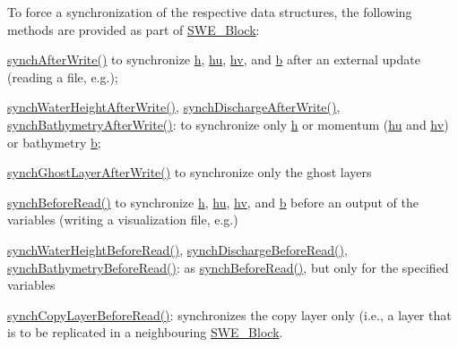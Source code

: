 To force a synchronization of the respective data structures, the following methods are provided as part of \hyperlink{classSWE__Block}{S\-W\-E\-\_\-\-Block}\-:
\begin{DoxyItemize}
\item \hyperlink{classSWE__Block_ae914f9bf6d4ef8f974f9f005114985e7}{synch\-After\-Write()} to synchronize \hyperlink{classSWE__Block_a64a0f8f437f38b5f3b8ec5b4abdb864e}{h}, \hyperlink{classSWE__Block_aec2c1278fdb23f083216d8d397f26060}{hu}, \hyperlink{classSWE__Block_a0897aa3c2d78749f209c95e08196d831}{hv}, and \hyperlink{classSWE__Block_af7487209129f40b26ea171762754a261}{b} after an external update (reading a file, e.\-g.);
\item \hyperlink{classSWE__Block_aa2924833e29a795d8c04fb79bfe794de}{synch\-Water\-Height\-After\-Write()}, \hyperlink{classSWE__Block_a94c34030153178c9d94f3f14be174eaf}{synch\-Discharge\-After\-Write()}, \hyperlink{classSWE__Block_a4bece8aa90f67e55c40b91aab900febb}{synch\-Bathymetry\-After\-Write()}\-: to synchronize only \hyperlink{classSWE__Block_a64a0f8f437f38b5f3b8ec5b4abdb864e}{h} or momentum (\hyperlink{classSWE__Block_aec2c1278fdb23f083216d8d397f26060}{hu} and \hyperlink{classSWE__Block_a0897aa3c2d78749f209c95e08196d831}{hv}) or bathymetry \hyperlink{classSWE__Block_af7487209129f40b26ea171762754a261}{b};
\item \hyperlink{classSWE__Block_a4657993ebdb5f0132b077e63790d0b2b}{synch\-Ghost\-Layer\-After\-Write()} to synchronize only the ghost layers
\item \hyperlink{classSWE__Block_a23d936cb9a4367092e5b2515f81fe819}{synch\-Before\-Read()} to synchronize \hyperlink{classSWE__Block_a64a0f8f437f38b5f3b8ec5b4abdb864e}{h}, \hyperlink{classSWE__Block_aec2c1278fdb23f083216d8d397f26060}{hu}, \hyperlink{classSWE__Block_a0897aa3c2d78749f209c95e08196d831}{hv}, and \hyperlink{classSWE__Block_af7487209129f40b26ea171762754a261}{b} before an output of the variables (writing a visualization file, e.\-g.)
\item \hyperlink{classSWE__Block_a07c85681ab29106c3b164db969899ace}{synch\-Water\-Height\-Before\-Read()}, \hyperlink{classSWE__Block_a3773dcb194212fb8cb40ab8465575aa1}{synch\-Discharge\-Before\-Read()}, \hyperlink{classSWE__Block_a7c8258c6949518ca44f4e9ce89d33b09}{synch\-Bathymetry\-Before\-Read()}\-: as \hyperlink{classSWE__Block_a23d936cb9a4367092e5b2515f81fe819}{synch\-Before\-Read()}, but only for the specified variables
\item \hyperlink{classSWE__Block_a13c90d5a6596336013c41e73c8795f83}{synch\-Copy\-Layer\-Before\-Read()}\-: synchronizes the copy layer only (i.\-e., a layer that is to be replicated in a neighbouring \hyperlink{classSWE__Block}{S\-W\-E\-\_\-\-Block}.
\end{DoxyItemize}

